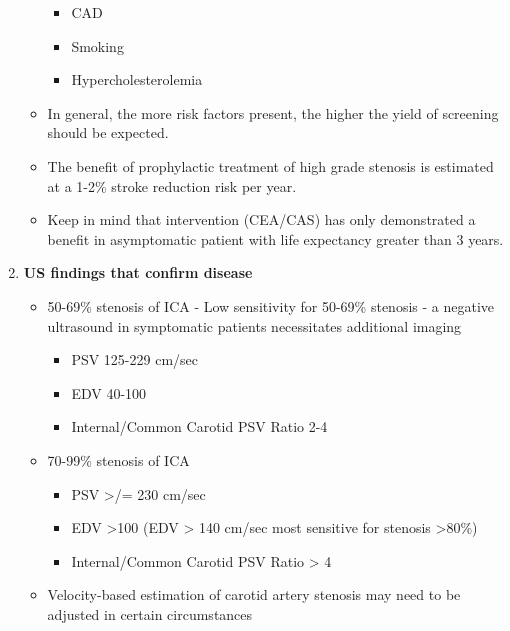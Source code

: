 \documentclass[
]{book}
\providecommand{\tightlist}{%
  \setlength{\itemsep}{0pt}\setlength{\parskip}{0pt}}
\begin{document}
\begin{enumerate}
\begin{itemize}
    \begin{itemize}
    \item
      CAD
    \item
      Smoking
    \item
      Hypercholesterolemia
    \end{itemize}
  \item
    In general, the more risk factors present, the higher the yield
    of screening should be expected.
  \item
    The benefit of prophylactic treatment of high grade stenosis is
    estimated at a 1-2\% stroke reduction risk per year.
    \citep{naylorWhyManagementAsymptomatic2015}
  \item
    Keep in mind that intervention (CEA/CAS) has only demonstrated a
    benefit in asymptomatic patient with life expectancy greater
    than 3 years. \citep{bulbuliaAsymptomaticCarotidSurgery2017, halliday10yearStrokePrevention2010, rosenfieldRandomizedTrialStent2016}
  \end{itemize}
\item
  \textbf{US findings that confirm disease}

  \begin{itemize}
  \item
    50-69\% stenosis of ICA - Low sensitivity for 50-69\% stenosis - a
    negative ultrasound in symptomatic patients necessitates
    additional imaging

    \begin{itemize}
    \tightlist
    \item
      PSV 125-229 cm/sec
    \item
      EDV 40-100
    \item
      Internal/Common Carotid PSV Ratio 2-4
    \end{itemize}
  \item
    70-99\% stenosis of ICA

    \begin{itemize}
    \item
      PSV \textgreater/= 230 cm/sec
    \item
      EDV \textgreater100 (EDV \textgreater{} 140 cm/sec most sensitive for stenosis \textgreater80\%)
    \item
      Internal/Common Carotid PSV Ratio \textgreater{} 4
    \end{itemize}
  \item
    Velocity-based estimation of carotid artery stenosis may need to
    be adjusted in certain circumstances


\end{itemize}
\end{enumerate}
\end{document}

